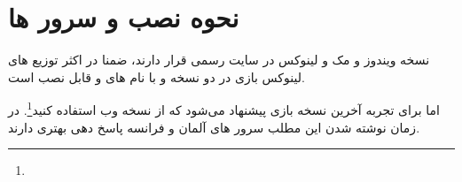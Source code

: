 \chapter*{نحوه نصب و سرور ها}

نسخه ویندوز و مک و لینوکس در سایت رسمی قرار دارند، ضمنا در اکثر توزیع های لینوکس بازی در دو نسخه  و  با نام های  و  قابل نصب است.

اما برای تجربه آخرین نسخه بازی پیشنهاد می‌شود که از نسخه وب استفاده کنید\footnote{}. در زمان نوشته شدن این مطلب سرور های آلمان و فرانسه پاسخ دهی بهتری دارند.
